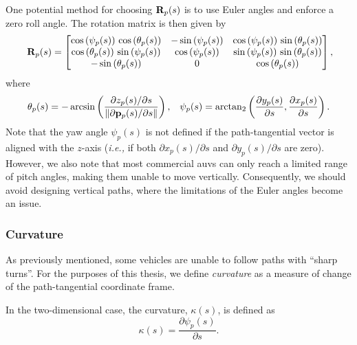 One potential method for choosing $\mathbf{R}_p(s)$ is to use Euler angles and enforce a zero roll angle.
The rotation matrix is then given by
\begin{equation}
    \mat{R}_p(s) =
    \begin{bmatrix}
         \cos\left(\psi_{p}(s)\right)\,\cos\left(\theta_{p}(s)\right) & -\sin\left(\psi_{p}(s)\right) & \cos\left(\psi_{p}(s)\right)\,\sin\left(\theta_{p}(s)\right) \\ \cos\left(\theta_{p}(s)\right)\,\sin\left(\psi_{p}(s)\right) & \cos\left(\psi_{p}(s)\right) & \sin\left(\psi_{p}(s)\right)\,\sin\left(\theta_{p}(s)\right) \\ -\sin\left(\theta_{p}(s)\right) & 0 & \cos\left(\theta_{p}(s)\right)
    \end{bmatrix}\mathrlap{,}
    \label{eq:background_R_p_zero_roll}
\end{equation}
where
\begin{align}
    \theta_{p}(s) &= - \arcsin\left(\frac{\partial z_p(s) / \partial s}{\left\|\partial \mathbf{p}_p(s) / \partial s\right\|}\right), &
    \psi_{p}(s) = \mathrm{arctan}_{2}\left(\frac{\partial  y_{p}(s)}{\partial s}, \frac{\partial  x_{p}(s)}{\partial s}\right).
\end{align}
Note that the yaw angle $\psi_{p}(s)$ is not defined if the path-tangential vector is aligned with the $z$-axis (\emph{i.e.,} if both $\partial x_p(s) / \partial s$ and $\partial y_p(s) / \partial s$ are zero).
However, we also note that most commercial \glspl{auv} can only reach a limited range of pitch angles, making them unable to move vertically.
Consequently, we should avoid designing vertical paths, where the limitations of the Euler angles become an issue.

\subsubsection*{Curvature}
As previously mentioned, some vehicles are unable to follow paths with ``sharp turns''.
For the purposes of this thesis, we define \emph{curvature} as a measure of change of the path-tangential coordinate frame.

In the two-dimensional case, the curvature, $\kappa(s)$, is defined as
\begin{equation}
    \kappa(s) = \frac{\partial \psi_{p}(s)}{\partial s}.
\end{equation}

